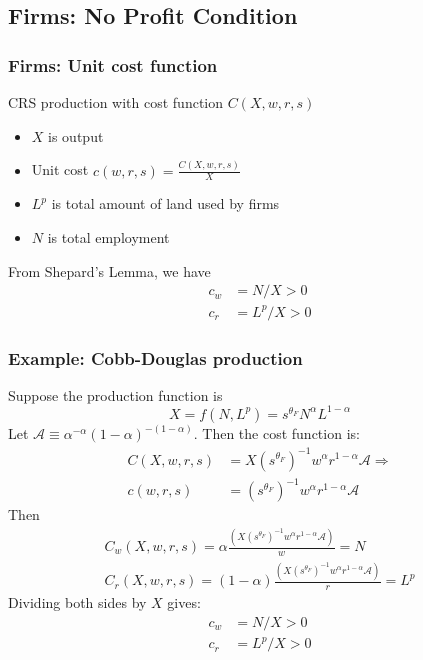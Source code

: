 \documentclass[10pt,notes=hide]{beamer}
\begin{document}
\subsection{Firms: No Profit Condition}
\begin{frame}
\frametitle{Firms: Unit cost function}
CRS production with cost function $C(X, w,r,s)$ 
\begin{itemize}
\item  $X$ is output
\item Unit cost $c(w, r, s)=\frac{C(X,w,r,s)}{X}$
\item $L^p$ is total amount of land used by firms
\item $N$ is total employment \medskip
\end{itemize}
From Shepard's Lemma, we have
\begin{align*}
c_w &= N/X >0 \\
c_r &= L^p/X >0
\end{align*}
\end{frame}
\begin{frame}
\frametitle{Example: Cobb-Douglas production}
Suppose the production function is
$$X=f(N,L^p)= s^{\theta_F} N^\alpha L^{1-\alpha}$$
Let $\mathcal{A} \equiv \alpha^{-\alpha} (1-\alpha)^{-(1-\alpha)}$.
Then the cost function is: 
\begin{align*}
C(X,w,r,s) &= X (s^{\theta_F})^{-1}w^\alpha r^{1-\alpha} \mathcal{A} \Rightarrow \\
c(w,r,s)&=(s^{\theta_F})^{-1}w^\alpha r^{1-\alpha} \mathcal{A}
\end{align*}
Then 
\begin{align*}
C_w(X,w,r,s) = \alpha \frac{\left(X (s^{\theta_F})^{-1}w^\alpha r^{1-\alpha} \mathcal{A} \right)}{w} = N \\
C_r(X,w,r,s) = (1-\alpha) \frac{\left(X (s^{\theta_F})^{-1}w^\alpha r^{1-\alpha} \mathcal{A} \right)}{r} = L^p
\end{align*}
Dividing both sides by $X$ gives:
\begin{align*}
c_w &= N/X >0 \\
c_r &= L^p/X >0
\end{align*}
\end{frame}
\end{document}
